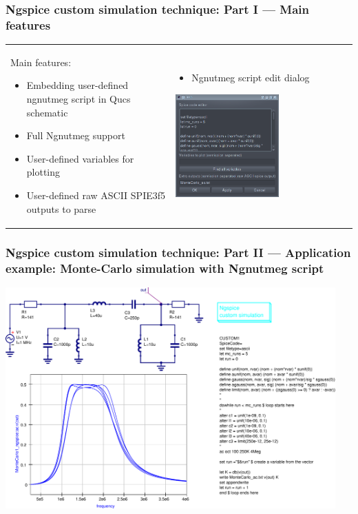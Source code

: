 \documentclass[9pt]{beamer}
\begin{document}
\begin{frame}
 \frametitle{Ngspice custom simulation technique: Part I --- Main features}
 
   \begin{tabular}{p{}p{}}
   Main features:
   \begin{itemize}
    \item Embedding user-defined ngnutmeg script in Qucs schematic
    \item Full Ngnutmeg support
    \item User-defined variables for plotting
    \item User-defined raw ASCII SPIE3f5 outputs to parse 
   \end{itemize}

    & 
    \begin{itemize}
     \item Ngnutmeg script edit dialog
    \end{itemize}
    \includegraphics[width=0.6\textwidth]{img/customsim_dlg}
    
    \\
   \end{tabular}

\end{frame}

\begin{frame}
 \frametitle{Ngspice custom simulation technique: Part II --- Application 
example: Monte-Carlo simulation with Ngnutmeg script}

\includegraphics[width=0.95\textwidth]{img/monte-carlo.pdf}
\end{frame}
\end{document}
